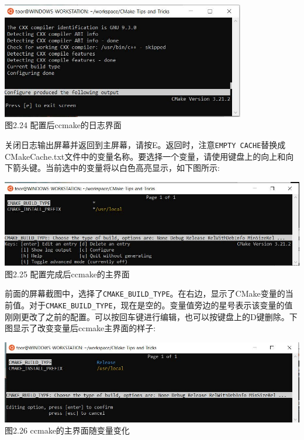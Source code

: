 \begin{center}
\includegraphics[width=0.8\textwidth]{content/1/chapter2/images/24.jpg}\\
图2.24 配置后ccmake的日志界面
\end{center}

关闭日志输出屏幕并返回到主屏幕，请按E。返回时，注意\texttt{EMPTY CACHE}替换成CMakeCache.txt文件中的变量名称。要选择一个变量，请使用键盘上的向上和向下箭头键。当前选中的变量将以白色高亮显示，如下图所示:

\begin{center}
\includegraphics[width=1.\textwidth]{content/1/chapter2/images/25.jpg}\\
图2.25 配置完成后ccmake的主界面
\end{center}

前面的屏幕截图中，选择了\texttt{CMAKE\_BUILD\_TYPE}。在右边，显示了CMake变量的当前值。对于\texttt{CMAKE\_BUILD\_TYPE}，现在是空的。变量值旁边的星号表示该变量的值刚刚更改了之前的配置。可以按回车键进行编辑，也可以按键盘上的D键删除。下图显示了改变变量后ccmake主界面的样子:

\begin{center}
\includegraphics[width=1.\textwidth]{content/1/chapter2/images/26.jpg}\\
图2.26 ccmake的主界面随变量变化
\end{center}

